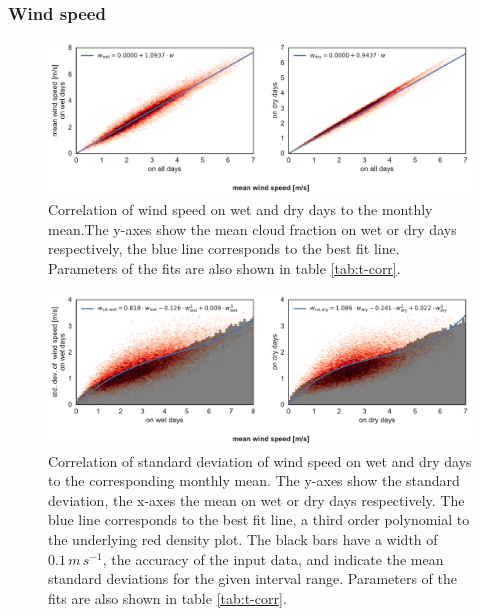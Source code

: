 \begin{refsection}
\subsubsection{Wind speed}
\begin{figure}
	\includegraphics[width=\linewidth]{gwgen-figures/f10.pdf}
	\caption[Correlation of wind speed on wet and dry days to the monthly mean]{Correlation of wind speed on wet and dry days to the monthly mean.The y-axes show the mean cloud fraction on wet or dry days respectively, the blue line corresponds to the best fit line. Parameters of the fits are also shown in table \ref{tab:t-corr}.}
	\label{fig:wind}
\end{figure}
\begin{figure}
	\includegraphics[width=\linewidth]{gwgen-figures/f11.pdf}
	\caption[Correlation of standard deviation of wind speed to the monthly mean]{Correlation of standard deviation of wind speed on wet and dry days to the corresponding monthly mean. The y-axes show the standard deviation, the x-axes the mean on wet or dry days respectively. The blue line corresponds to the best fit line, a third order polynomial to the underlying red density plot. The black bars have a width of $0.1\, \unit{m}\, \unit{s}^{-1}$, the accuracy of the input data, and indicate the mean standard deviations for the given interval range. Parameters of the fits are also shown in table \ref{tab:t-corr}.}
	\label{fig:wind_sd}
\end{figure}


\end{refsection}
